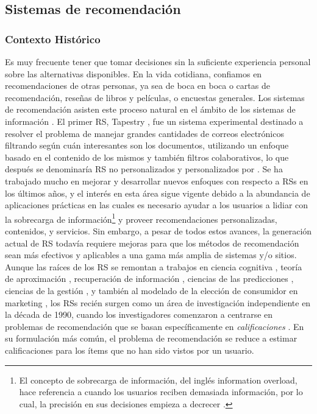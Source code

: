 \subsection{Sistemas de recomendación}
\subsubsection{Contexto Histórico}
Es muy frecuente tener que tomar decisiones sin la suficiente experiencia personal sobre las alternativas disponibles. En la vida cotidiana, confiamos en recomendaciones de otras personas, ya sea de boca en boca o cartas de recomendación, reseñas de libros y películas, o encuestas generales. Los sistemas de recomendación asisten este proceso natural en el ámbito de los sistemas de información \citep{resnick1997recommender}. El primer RS, Tapestry \citep{goldberg1992using}, fue un sistema experimental destinado a resolver el problema de manejar grandes cantidades de correos electrónicos filtrando según cuán interesantes son los documentos, utilizando un enfoque basado en el contenido de los mismos y también filtros colaborativos, lo que después se denominaría RS no personalizados y personalizados por \cite{ricci2011introduction}. Se ha trabajado mucho en mejorar y desarrollar nuevos enfoques con respecto a RSs en los últimos años, y el interés en esta área sigue vigente debido a la abundancia de aplicaciones prácticas en las cuales es necesario ayudar a los usuarios a lidiar con la sobrecarga de información\footnote{El concepto de sobrecarga de información, del inglés information overload, hace referencia a cuando los usuarios reciben demasiada información, por lo cual, la precisión en sus decisiones empieza a decrecer \citep{eppler2004concept}.} y proveer recomendaciones personalizadas, contenidos, y servicios. Sin embargo, a pesar de todos estos avances, la generación actual de RS todavía requiere mejoras para que los métodos de recomendación sean más efectivos y aplicables a una gama más amplia de sistemas y/o sitios. Aunque las raíces de los RS se remontan a trabajos en ciencia cognitiva \citep{rich1979user}, teoría de aproximación \citep{powell1981approximation}, recuperación de información \citep{salton1989automatic}, ciencias de las predicciones \citep{armstrong2001principles}, ciencias de la gestión \citep{murthi2003role}, y también al modelado de la elección de consumidor en marketing \citep{lilien1992marketing}, los RSs recién surgen como un área de investigación independiente en la década de 1990, cuando los investigadores comenzaron a centrarse en problemas de recomendación que se basan específicamente en \textit{calificaciones} \citep{adomavicius2005toward}. En su formulación más común, el problema de recomendación se reduce a estimar calificaciones para los ítems que no han sido vistos por un usuario.

